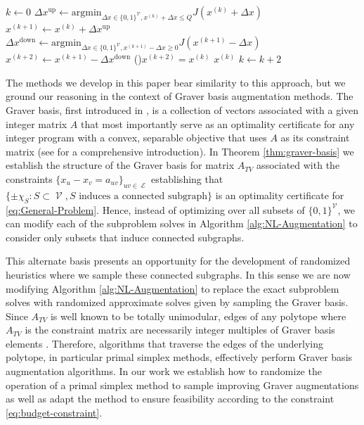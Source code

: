 \documentclass[pdflatex,sn-mathphys-num]{sn-jnl}%
\newcommand{\Z}{\mathbb{Z}} %
\DeclareMathOperator{\Ecal}{\mathcal{E}}
\DeclareMathOperator{\Vcal}{\mathcal{V}}
\begin{document}
\begin{algorithm}
\caption{Augmentation Algorithm for Unconstrained Version of \eqref{eq:General-Problem} (from \cite{kolmogorov2009new})}\label{alg:NL-Augmentation}
\DontPrintSemicolon
\KwData{$x^{(0)} \in \{0,1,\ldots,Q\}^{\Vcal}$}
$k \gets 0$\;
{    
    $\Delta x^{\text{up}} \gets \text{argmin}_{\Delta x \in \{0,1\}^{\Vcal}, x^{(k)}+\Delta x \le Q} J(x^{(k)} + \Delta x)$\;
    $x^{(k+1)} \gets x^{(k)} + \Delta x^{\text{up}}$\;
    $\Delta x^{\text{down}} \gets \text{argmin}_{\Delta x \in \{0,1\}^{\Vcal}, x^{(k+1)}-\Delta x \ge 0} J(x^{(k+1)} - \Delta x)$\;
    $x^{(k+2)} \gets x^{(k+1)} - \Delta x^{\text{down}}$\;
    \If(){$x^{(k+2)} = x^{(k)}$}
    {
        \Return $x^{(k)}$ 
    }
    $k \gets k + 2$\;
}
\end{algorithm}

The methods we develop in this paper bear similarity to this approach, but we ground our reasoning in the context of Graver basis augmentation methods. 
The Graver basis, first introduced in \cite{graver1975foundations}, is a collection of vectors associated with a given integer matrix $A$ that most importantly serve as an optimality certificate for any integer program with a convex, separable objective that uses $A$ as its constraint matrix (see \cite{de2012algebraic} for a comprehensive introduction). In Theorem \ref{thm:graver-basis} we establish the structure of the Graver basis for matrix $A_{TV}$ associated with the constraints $\{x_u - x_v = a_{uv}\}_{uv \in \Ecal}$ establishing that $\{\pm \chi_S : S \subset \Vcal, S \text{ induces a connected subgraph}\}$ is an optimality certificate for \eqref{eq:General-Problem}.
Hence, instead of optimizing over all subsets of $\{0,1\}^{\Vcal}$, we can modify each of the subproblem solves in Algorithm \ref{alg:NL-Augmentation} to  consider only subsets that induce connected subgraphs. 

This alternate basis presents an opportunity for the development of randomized heuristics where we sample these connected subgraphs.
In this sense we are now modifying Algorithm \ref{alg:NL-Augmentation} to replace the exact subproblem solves with randomized approximate solves given by sampling the Graver basis.
Since $A_{TV}$ is well known to be totally unimodular, edges of any polytope where $A_{TV}$ is the constraint matrix are necessarily integer multiples of Graver basis elements \cite{thomas1995geometric}.
Therefore, algorithms that traverse the edges of the underlying polytope, in particular primal simplex methods, effectively perform Graver basis augmentation algorithms.
In our work we establish how to randomize the operation of a primal simplex method to sample improving Graver augmentations as well as adapt the method to ensure feasibility according to the constraint \eqref{eq:budget-constraint}. 
\end{document}
